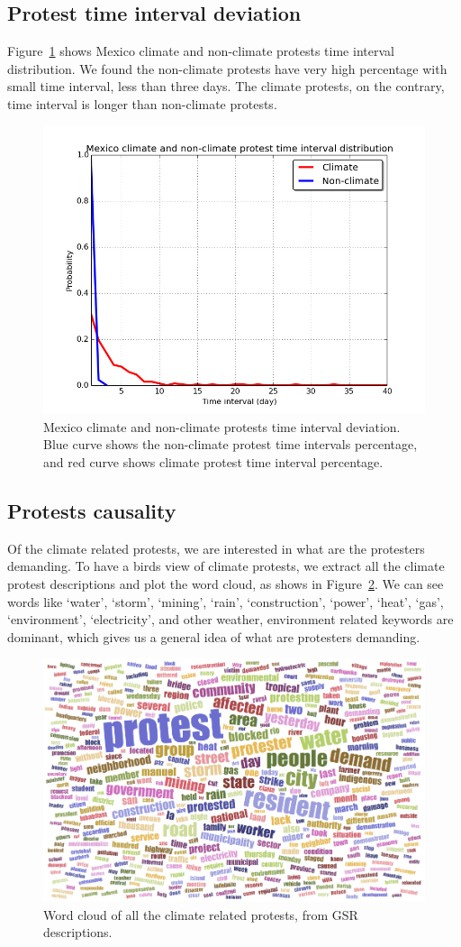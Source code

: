 \documentclass[9pt,twocolumn,twoside]{pnas-new}
\begin{document}
\subsection{Protest time interval deviation}
Figure~\ref{Mexico-deviation} shows Mexico climate and non-climate protests time interval distribution. We found the non-climate protests have very high percentage with small time interval, less than three days. The climate protests, on the contrary, time interval is longer than non-climate protests.

\begin{figure}[ht]
\centerline
{\includegraphics[width=.3\textwidth]{figures/Mexico_deviation}}
\caption{Mexico climate and non-climate protests time interval deviation. Blue curve shows the non-climate protest time intervals percentage, and red curve shows climate protest time interval percentage.}
\label{Mexico-deviation}
\end{figure}


\subsection{Protests causality}
Of the climate related protests, we are interested in what are the protesters demanding. To have a birds view of climate protests, we extract all the climate protest descriptions and plot the word cloud, as shows in Figure~\ref{wordcloud}. We can see words like `water', `storm', `mining', `rain', `construction', `power', `heat', `gas', `environment', `electricity', and other weather, environment related keywords are dominant, which gives us a general idea of what are protesters demanding.

\begin{figure}[ht]
\centerline
{\includegraphics[width=.35\textwidth]{figures/Climate_word_cloud}}
\caption{Word cloud of all the climate related protests, from GSR descriptions.}
\label{wordcloud}
\end{figure}
\end{document}
